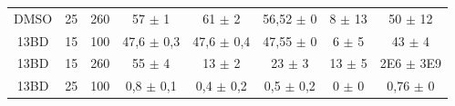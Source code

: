 \begin{table}[h]
\begin{adjustbox}{angle=90}
{\begin{tabular}{c c c | c c c c c}
			  DMSO    & 25         & 260        & 57      \(\pm\) 1   & 61       \(\pm\) 2   & 56,52    \(\pm\) 0   & 8           \(\pm\) 13  & 50          \(\pm\) 12  \\ 
			  13BD    & 15         & 100        & 47,6    \(\pm\) 0,3 & 47,6     \(\pm\) 0,4 & 47,55    \(\pm\) 0   & 6           \(\pm\) 5   & 43          \(\pm\) 4   \\
			  13BD    & 15         & 260        & 55      \(\pm\) 4   & 13       \(\pm\) 2   & 23       \(\pm\) 3   & 13          \(\pm\) 5   & 2E6       \(\pm\) 3E9   \\
			  13BD    & 25         & 100        & 0,8     \(\pm\) 0,1 & 0,4      \(\pm\) 0,2 & 0,5      \(\pm\) 0,2 & 0           \(\pm\) 0   & 0,76        \(\pm\) 0   \\ \bottomrule
		\end{tabular}
	}{} \end{adjustbox}
\end{table} 

